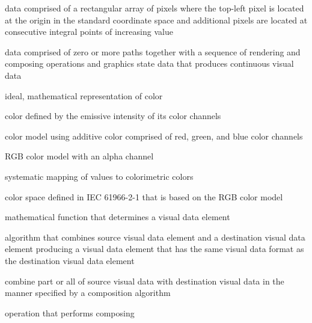 %
data comprised of a rectangular array of pixels where the top-left pixel is located at the origin in the standard coordinate space and additional pixels are located at consecutive integral points of increasing value

%
data comprised of zero or more paths together with a sequence of rendering and composing operations and graphics state data that produces continuous visual data

%
ideal, mathematical representation of color

%
color defined by the emissive intensity of its color channels

%
%
color model using additive color comprised of red, green, and blue color channels

%
%
RGB color model with an alpha channel

%
systematic mapping of values to colorimetric colors

%
%
color space defined in IEC 61966-2-1 that is based on the RGB color model

%
mathematical function that determines a visual data element

%
algorithm that combines source visual data element and a destination visual data element producing a visual data element that has the same visual data format as the destination visual data element

%
combine part or all of source visual data with destination visual data in the manner specified by a composition algorithm

%
operation that performs composing

